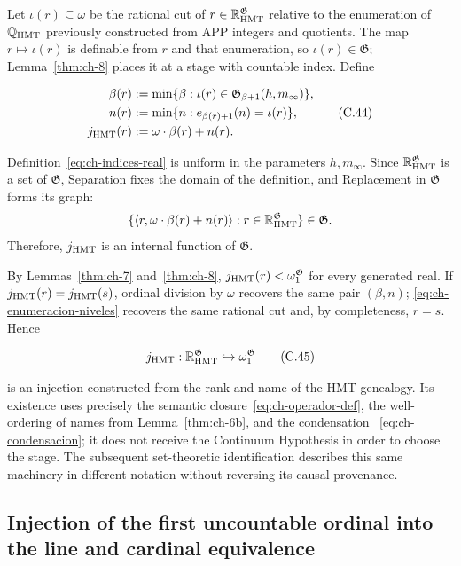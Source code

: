 Let \(\iota(r)\subseteq\omega\) be the rational cut of
\(r\in\mathbb R_{\rm HMT}^{\mathfrak G}\) relative to the enumeration of
\(\mathbb Q_{\rm HMT}\) previously constructed from APP integers and
quotients. The map \(r\mapsto\iota(r)\) is definable from \(r\) and that
enumeration, so \(\iota(r)\in\mathfrak G\); Lemma~\ref{thm:ch-8} places it at
a stage with countable index. Define

\[
 \begin{aligned}
  \beta(r)&:=\min\{\beta:
       \iota(r)\in\mathfrak G_{\beta+1}(h,m_\infty)\},\\
  n(r)&:=\min\{n:e_{\beta(r)+1}(n)=\iota(r)\},\\
  j_{\rm HMT}(r)&:=\omega\cdot\beta(r)+n(r).
 \end{aligned}
\tag{C.44}\label{eq:ch-indices-real}
\]

Definition~\eqref{eq:ch-indices-real} is uniform in the parameters
\(h,m_\infty\). Since \(\mathbb R_{\rm HMT}^{\mathfrak G}\) is a set of
\(\mathfrak G\), Separation fixes the domain of the definition, and
Replacement in \(\mathfrak G\) forms its graph:
\[
 \{\langle r,\omega\cdot\beta(r)+n(r)\rangle:
 r\in\mathbb R_{\rm HMT}^{\mathfrak G}\}\in\mathfrak G.
\]
Therefore, \(j_{\rm HMT}\) is an internal function of \(\mathfrak G\).

By Lemmas~\ref{thm:ch-7} and~\ref{thm:ch-8},
\(j_{\rm HMT}(r)<\omega_1^{\mathfrak G}\) for every generated real. If
\(j_{\rm HMT}(r)=j_{\rm HMT}(s)\), ordinal division by \(\omega\) recovers the
same pair \((\beta,n)\); \eqref{eq:ch-enumeracion-niveles} recovers the same
rational cut and, by completeness, \(r=s\). Hence

\[
 j_{\rm HMT}:\mathbb R_{\rm HMT}^{\mathfrak G}
 \hookrightarrow\omega_1^{\mathfrak G}
\tag{C.45}\label{eq:ch-inyeccion-j}
\]

is an injection constructed from the rank and name of the HMT genealogy. Its
existence uses precisely the semantic closure~\eqref{eq:ch-operador-def}, the
well-ordering of names from Lemma~\ref{thm:ch-6b}, and the condensation
~\eqref{eq:ch-condensacion}; it does not receive the Continuum Hypothesis in
order to choose the stage. The subsequent set-theoretic identification
describes this same machinery in different notation without reversing its
causal provenance.

\subsection{Injection of the first uncountable ordinal into the line and cardinal equivalence}


